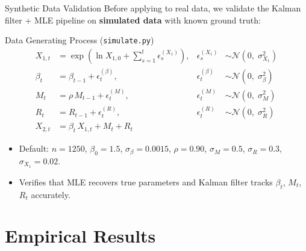 \documentclass[10pt, aspectratio=169]{beamer}
\begin{document}
\begin{frame}{Synthetic Data Validation}
  Before applying to real data, we validate the Kalman filter + MLE
  pipeline on \textbf{simulated data} with known ground truth:
  \vspace{6pt}
  \begin{block}{Data Generating Process (\texttt{simulate.py})}
    \begin{align*}
      X_{1,t} &= \exp\!\left(\ln X_{1,0} + \sum_{s=1}^{t}\epsilon_s^{(X_1)}\right),
        &\epsilon_s^{(X_1)} &\sim \mathcal{N}(0,\;\sigma_{X_1}^2)\\[3pt]
      \beta_t &= \beta_{t-1} + \epsilon_t^{(\beta)},
        &\epsilon_t^{(\beta)} &\sim \mathcal{N}(0,\;\sigma_{\beta}^2)\\[3pt]
      M_t &= \rho\,M_{t-1} + \epsilon_t^{(M)},
        &\epsilon_t^{(M)} &\sim \mathcal{N}(0,\;\sigma_M^2)\\[3pt]
      R_t &= R_{t-1} + \epsilon_t^{(R)},
        &\epsilon_t^{(R)} &\sim \mathcal{N}(0,\;\sigma_R^2)\\[3pt]
      X_{2,t} &= \beta_t\,X_{1,t} + M_t + R_t
    \end{align*}
  \end{block}
  \vspace{4pt}
  \begin{itemize}
    \item Default: $n = 1250$, $\beta_0 = 1.5$, $\sigma_\beta = 0.0015$,
          $\rho = 0.90$, $\sigma_M = 0.5$, $\sigma_R = 0.3$, $\sigma_{X_1} = 0.02$.
    \item Verifies that MLE recovers true parameters and Kalman filter
          tracks $\beta_t$, $M_t$, $R_t$ accurately.
  \end{itemize}
\end{frame}

\section{Empirical Results}
\end{document}
